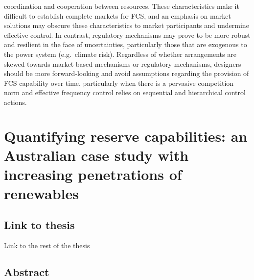 \documentclass[12pt,a4paper,]{report}
\begin{document}
\begin{enumerate}
  coordination and cooperation between resources. These characteristics
  make it difficult to establish complete markets for FCS, and an
  emphasis on market solutions may obscure these characteristics to
  market participants and undermine effective control. In contrast,
  regulatory mechanisms may prove to be more robust and resilient in the
  face of uncertainties, particularly those that are exogenous to the
  power system (e.g.~climate risk). Regardless of whether arrangements
  are skewed towards market-based mechanisms or regulatory mechanisms,
  designers should be more forward-looking and avoid assumptions
  regarding the provision of FCS capability over time, particularly when
  there is a pervasive competition norm and effective frequency control
  relies on sequential and hierarchical control actions.
\end{enumerate}

\hypertarget{sec:reserves}{%
\chapter{Quantifying reserve capabilities: an Australian case study with
increasing penetrations of renewables}\label{sec:reserves}}

\hypertarget{link-to-thesis-1}{%
\section{Link to thesis}\label{link-to-thesis-1}}

Link to the rest of the thesis

\hypertarget{abstract-2}{%
\section{Abstract}\label{abstract-2}}
\end{document}
